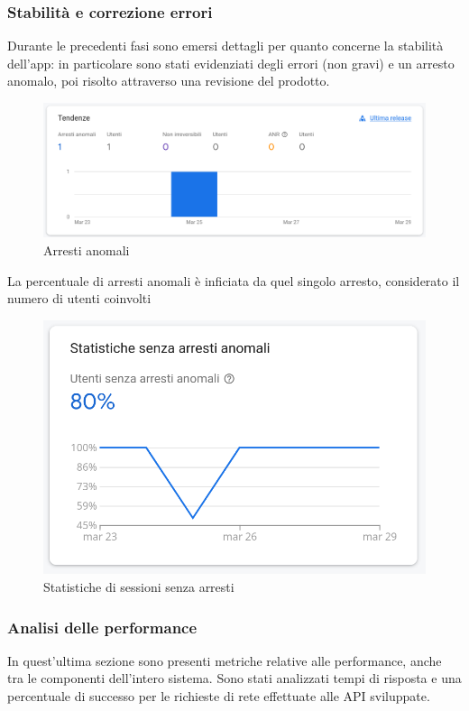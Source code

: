 \documentclass{natourDoc}
\begin{document}
\subsubsection{Stabilità e correzione errori}
Durante le precedenti fasi sono emersi dettagli per quanto concerne la stabilità dell'app:
in particolare sono stati evidenziati degli errori (non gravi) e un arresto anomalo, poi risolto
attraverso una revisione del prodotto.
\begin{figure}[!htbp]
	\centering
	\includegraphics[width=\textwidth]{./analytics/arresti-anomali.png}
	\caption{Arresti anomali}
\end{figure}
\FloatBarrier

La percentuale di arresti anomali è inficiata da quel singolo arresto, considerato
il numero di utenti coinvolti
\begin{figure}[!htbp]
	\centering
	\includegraphics[width=\textwidth]{./analytics/senza-arresti.png}
	\caption{Statistiche di sessioni senza arresti}
\end{figure}
\FloatBarrier

\newpage

\subsubsection{Analisi delle performance}
In quest'ultima sezione sono presenti metriche relative alle performance, anche tra le componenti
dell'intero sistema.
Sono stati analizzati tempi di risposta e una percentuale di successo per le richieste di rete
effettuate alle API sviluppate.
\end{document}
